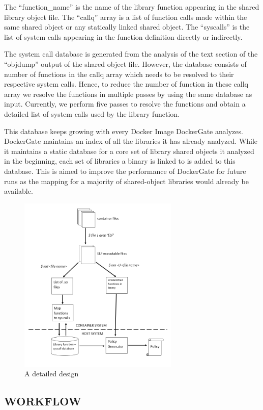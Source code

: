 The “function\_name” is the name of the library function appearing in the shared library object file. The “callq” array is a list of function calls made within the same shared object or any statically linked shared object. The “syscalls” is the list of system calls appearing in the function definition directly or indirectly. 

The system call database is generated from the analysis of the text section of the “objdump” output of the shared object file. However, the database consists of number of functions in the callq array which needs to be resolved to their respective system calls. Hence, to reduce the number of function in these callq array we resolve the functions in multiple passes by using the same database as input. Currently, we perform five passes to resolve the functions and obtain a detailed list of system calls used by the library function.

This database keeps growing with every Docker Image DockerGate analyzes. DockerGate maintains an index of all the libraries it has already analyzed. While it maintains a static database for a core set of library shared objects it analyzed in the beginning, each set of libraries a binary is linked to is added to this database. This is aimed to improve the performance of DockerGate for future runs as the mapping for a majority of shared-object libraries would already be available.

\begin{figure}[t]
  \centering
  \includegraphics[width=3in]{figs/design_detail}
  \caption{A detailed design}
  \label{fig:design_detail}
\end{figure}

\subsection{WORKFLOW}

